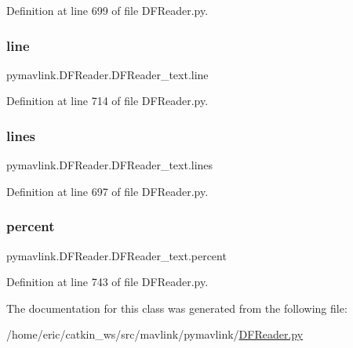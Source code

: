 Definition at line 699 of file D\+F\+Reader.\+py.

\mbox{\label{classpymavlink_1_1DFReader_1_1DFReader__text_a3d7b847a7d16c3bd1875fe17c7e5659a}} 
\subsubsection{\texorpdfstring{line}{line}}
{\footnotesize\ttfamily pymavlink.\+D\+F\+Reader.\+D\+F\+Reader\+\_\+text.\+line}



Definition at line 714 of file D\+F\+Reader.\+py.

\mbox{\label{classpymavlink_1_1DFReader_1_1DFReader__text_a1c5eb70b7d8eacfbd8a3a5187755d95d}} 
\subsubsection{\texorpdfstring{lines}{lines}}
{\footnotesize\ttfamily pymavlink.\+D\+F\+Reader.\+D\+F\+Reader\+\_\+text.\+lines}



Definition at line 697 of file D\+F\+Reader.\+py.

\mbox{\label{classpymavlink_1_1DFReader_1_1DFReader__text_aa93b2a84c631703bcbcffdbdc69898e4}} 
\subsubsection{\texorpdfstring{percent}{percent}}
{\footnotesize\ttfamily pymavlink.\+D\+F\+Reader.\+D\+F\+Reader\+\_\+text.\+percent}



Definition at line 743 of file D\+F\+Reader.\+py.



The documentation for this class was generated from the following file\+:\begin{DoxyCompactItemize}
\item 
/home/eric/catkin\+\_\+ws/src/mavlink/pymavlink/\mbox{\hyperlink{DFReader_8py}{D\+F\+Reader.\+py}}\end{DoxyCompactItemize}

